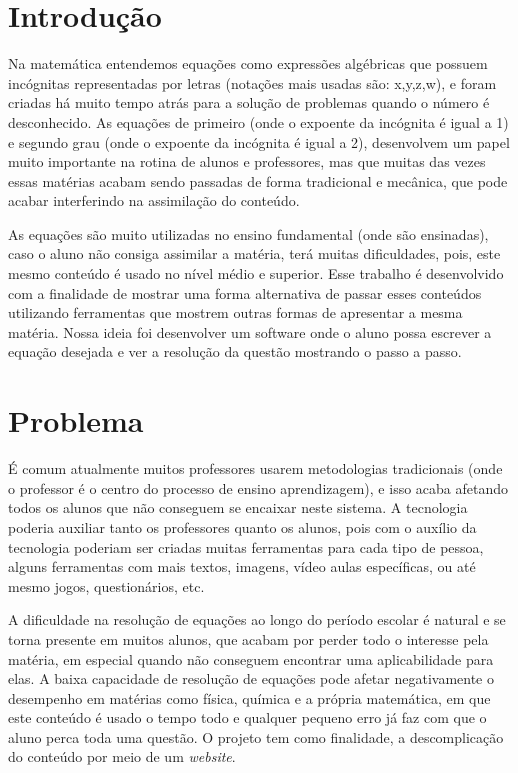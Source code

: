 \documentclass[12pt]{report}
\begin{document}
\tableofcontents
\newpage

\chapter{Introdução}
Na matemática entendemos equações como expressões algébricas que possuem incógnitas representadas por letras (notações mais usadas são: x,y,z,w), e foram criadas há muito tempo atrás para a solução de problemas quando o número é desconhecido. As equações de primeiro (onde o expoente da incógnita é igual a 1) e segundo grau  (onde o expoente da incógnita é igual a 2), desenvolvem um papel muito importante na rotina de alunos e professores, mas que muitas das vezes essas matérias acabam sendo passadas de forma tradicional e mecânica, que pode acabar interferindo na assimilação do conteúdo.

As equações são muito utilizadas no ensino fundamental (onde são ensinadas), caso o aluno não consiga assimilar a matéria, terá muitas dificuldades, pois, este mesmo conteúdo é usado no nível médio e superior. Esse trabalho é desenvolvido com a finalidade de mostrar uma forma alternativa de passar esses conteúdos utilizando ferramentas que mostrem outras formas de apresentar a mesma matéria. Nossa ideia foi desenvolver um software onde o aluno possa escrever a equação desejada e ver a resolução da questão mostrando o passo a passo. 

\chapter{Problema}
É comum atualmente muitos professores usarem metodologias tradicionais (onde o professor é o centro do processo de ensino aprendizagem), e isso acaba afetando todos os alunos que não conseguem se encaixar neste sistema. A tecnologia poderia auxiliar tanto os professores quanto os alunos, pois com o auxílio da tecnologia poderiam ser criadas muitas ferramentas para cada tipo de pessoa, alguns ferramentas com mais textos, imagens, vídeo aulas específicas, ou até mesmo jogos, questionários, etc.

A dificuldade na resolução de equações ao longo do período escolar é natural e se torna presente em muitos alunos, que acabam por perder todo o interesse pela matéria, em especial quando não conseguem encontrar uma aplicabilidade para elas. A baixa capacidade de resolução de equações pode afetar negativamente o desempenho em matérias como física, química e a própria matemática, em que este conteúdo é usado o tempo todo e qualquer pequeno erro já faz com que o aluno perca toda uma questão. O projeto tem como finalidade, a descomplicação do conteúdo por meio de um \textit{website}.
\end{document}
